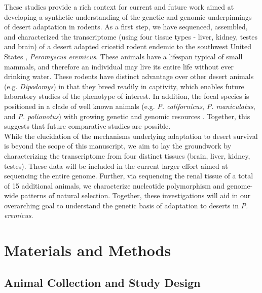 \documentclass[11pt]{article}
\begin{document}
These studies provide a rich context for current and future work aimed at developing a synthetic understanding of the genetic and genomic underpinnings of desert adaptation in rodents. As a first step, we have sequenced, assembled, and characterized the transcriptome (using four tissue types - liver, kidney, testes and brain) of a desert adapted cricetid rodent endemic to the southwest United States \cite{Veal:2001vp}, \textit{Peromyscus eremicus}. These animals have a lifespan typical of small mammals, and therefore an individual may live its entire life without ever drinking water. These rodents have distinct advantage over other desert animals (e.g. \textit{Dipodomys}) in that they breed readily in captivity, which enables future laboratory studies of the phenotype of interest. In addition, the focal species is positioned in a clade of well known animals (e.g. \textit{P. californicus}, \textit{P. maniculatus}, and \textit{P. polionotus}) \cite{Bradley:2007jo} with growing genetic and genomic resources \cite{Shorter:2014kw,Panhuis:2011co,Shorter:2012ib}. Together, this suggests that future comparative studies are possible. \\

While the elucidation of the mechanisms underlying adaptation to desert survival is beyond the scope of this manuscript, we aim to lay the groundwork by characterizing the transcriptome from four distinct tissues (brain, liver, kidney, testes). These data will be included in the current larger effort aimed at sequencing the entire genome. Further, via sequencing the renal tissue of a total of 15 additional animals, we characterize nucleotide polymorphism and genome-wide patterns of natural selection. Together, these investigations will aid in our overarching goal to understand the genetic basis of adaptation to deserts in \textit{P. eremicus}.

\section*{Materials and Methods}

\subsection*{Animal Collection and Study Design}
\end{document}
